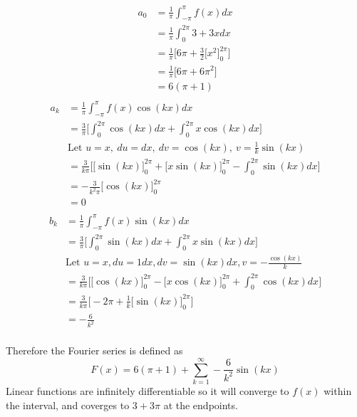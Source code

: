 \documentclass{article}
\begin{document}
\begin{enumerate}
\begin{enumerate}
\begin{multicols}{2}
\noindent
\begin{align*}
    a_0 &= \frac{1}{\pi} \int_{-\pi}^{\pi}f(x) dx \\
    &= \frac{1}{\pi} \int_{0}^{2\pi}3 + 3x dx \\
    &= \frac{1}{\pi} \Bigg[6\pi +  \frac{3}{2}\Big[x^2\Big]^{2\pi}_{0}\Bigg] \\
    &= \frac{1}{\pi} \Bigg[6\pi + 6\pi^2 \Bigg] \\
    &= 6(\pi + 1)\\
\end{align*}
\begin{align*}
    a_k &= \frac{1}{\pi} \int_{-\pi}^{\pi}f(x)\cos(kx) dx \\
    &= \frac{3}{\pi}\Bigg[ \int_{0}^{2\pi}\cos(kx) dx + \int_{0}^{2\pi}x\cos(kx) dx \Bigg] \\
    &\text{Let } u = x,\: du = dx,\: dv = \cos(kx),\: v = \frac{1}{k}\sin(kx) \\
    &= \frac{3}{k\pi}\Bigg[\Big[\sin(kx)\Big]_{0}^{2\pi} + \Big[x \sin(kx)\Big]^{2\pi}_{0} - \int_{0}^{2\pi} \sin(kx) dx\Bigg] \\
    &= -\frac{3}{k^2\pi}\Big[\cos(kx)\Big]_{0}^{2\pi} \\
    &= 0 \\
\end{align*}
\begin{align*}
    b_k &= \frac{1}{\pi} \int_{-\pi}^{\pi}f(x)\sin(kx) dx \\
    &= \frac{3}{\pi}\Bigg[ \int_{0}^{2\pi}\sin(kx) dx + \int_{0}^{2\pi}x\sin(kx) dx \Bigg] \\
    &\text{Let $u = x, du = 1 dx, dv = \sin(kx) dx, v = -\frac{\cos(kx)}{k}$} \\
    &= \frac{3}{k\pi}\Bigg[ \Big[\cos(kx)\Big]_{0}^{2\pi} - \Big[x\cos(kx)\Big]_{0}^{2\pi} + \int_{0}^{2\pi}\cos(kx) dx \Bigg] \\
    &= \frac{3}{k\pi}\Bigg[ -2\pi + \frac{1}{k} \Big[\sin(kx)\Big]_{0}^{2\pi}  \Bigg] \\
    &= -\frac{6}{k^2}\\ 
    \end{align*} 
    \end{multicols}
    Therefore the Fourier series is defined as 
    \[
        F(x) = 6(\pi + 1) + \sum_{k=1}^{\infty}-\frac{6}{k^2}\sin(kx)
    \]
    Linear functions are infinitely differentiable so it will converge to $f(x)$ within the interval, and coverges to $3+3\pi$ at the endpoints.
\end{enumerate}


\end{enumerate}
\end{document}
